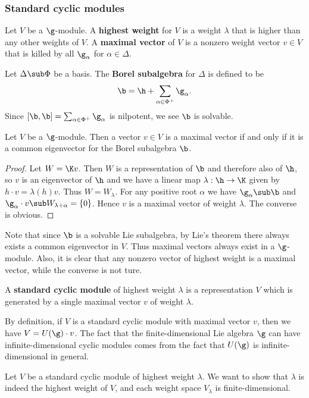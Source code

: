 \subsubsection{Standard cyclic modules}
Let $V$ be a $\g$-module. A \textbf{highest weight} for $V$ is a weight $\lambda$ that is higher than any other weights of $V$. A \textbf{maximal vector} of $V$ is a nonzero weight vector $v\in V$ that is killed by all $\g_\alpha$ for $\alpha\in\Delta$.
\begin{definition}
Let $\Delta\sub\Phi$ be a basis. The \textbf{Borel subalgebra} for $\Delta$ is defined to be
\[\b=\h+\sum_{\alpha\in\Phi^+}\g_\alpha.\]
Since $[\b,\b]=\sum_{\alpha\in\Phi^+}\g_\alpha$ is nilpotent, we see $\b$ is solvable.
\end{definition}
\begin{proposition}\label{Lie algebra rep maximal vector iff Borel}
Let $V$ be a $\g$-module. Then a vector $v\in V$ is a maximal vector if and only if it is a common eigenvector for the Borel subalgebra $\b$.
\end{proposition}
\begin{proof}
Let $W=\K v$. Then $W$ is a representation of $\b$ and therefore also of $\h$, so $v$ is an eigenvector of $\h$ and we have a linear map $\lambda:\h\to\K$ given by $h\cdot v=\lambda(h)v$. Thus $W= W_\lambda$. For any positive root $\alpha$ we have $\g_\alpha\sub\b$ and $\g_\alpha\cdot v\sub W_{\lambda+\alpha}=\{0\}$. Hence $v$ is a maximal vector of weight $\lambda$. The converse is obvious.
\end{proof}
Note that since $\b$ is a solvable Lie subalgebra, by Lie's theorem there always exists a common eigenvector in $V$. Thus maximal vectors always exist in a $\g$-module. Also, it is clear that any nonzero vector of highest weight is a maximal vector, while the converse is not ture.
\begin{definition}
A \textbf{standard cyclic module} of highest weight $\lambda$ is a representation $V$ which is generated by a single maximal vector $v$ of weight $\lambda$.
\end{definition}
By definition, if $V$ is a standard cyclic module with maximal vector $v$, then we have $V=U(\g)\cdot v$. The fact that the finite-dimensional Lie algebra $\g$ can have infinite-dimensional cyclic modules comes from the fact that $U(\g)$ is infinite-dimensional in general.\par
Let $V$ be a standard cyclic module of highest weight $\lambda$. We want to show that $\lambda$ is indeed the highest weight of $V$, and each weight space $V_\lambda$ is finite-dimensional.
